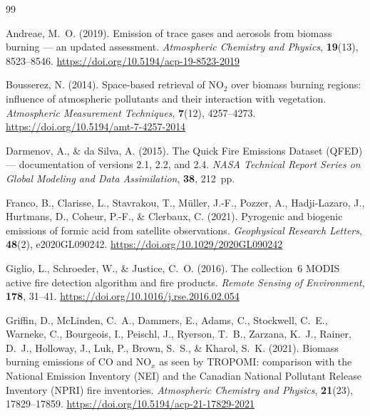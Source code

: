 \documentclass[draft]{agujournal2019}
\begin{document}

\begin{thebibliography}{99}

Andreae, M.~O. (2019).
Emission of trace gases and aerosols from biomass burning --- an updated
  assessment.
\textit{Atmospheric Chemistry and Physics}, \textbf{19}(13), 8523--8546.
\url{https://doi.org/10.5194/acp-19-8523-2019}

Bousserez, N. (2014).
Space-based retrieval of NO$_2$ over biomass burning regions: influence of
  atmospheric pollutants and their interaction with vegetation.
\textit{Atmospheric Measurement Techniques}, \textbf{7}(12), 4257--4273.
\url{https://doi.org/10.5194/amt-7-4257-2014}

Darmenov, A., \& da Silva, A. (2015).
The Quick Fire Emissions Dataset (QFED) --- documentation of versions 2.1,
  2.2, and 2.4.
\textit{NASA Technical Report Series on Global Modeling and Data
  Assimilation}, \textbf{38}, 212~pp.

Franco, B., Clarisse, L., Stavrakou, T., M{\"u}ller, J.-F., Pozzer, A.,
  Hadji-Lazaro, J., Hurtmans, D., Coheur, P.-F., \& Clerbaux, C. (2021).
Pyrogenic and biogenic emissions of formic acid from satellite observations.
\textit{Geophysical Research Letters}, \textbf{48}(2), e2020GL090242.
\url{https://doi.org/10.1029/2020GL090242}

Giglio, L., Schroeder, W., \& Justice, C.~O. (2016).
The collection~6 MODIS active fire detection algorithm and fire products.
\textit{Remote Sensing of Environment}, \textbf{178}, 31--41.
\url{https://doi.org/10.1016/j.rse.2016.02.054}

Griffin, D., McLinden, C.~A., Dammers, E., Adams, C., Stockwell, C.~E.,
  Warneke, C., Bourgeois, I., Peischl, J., Ryerson, T.~B., Zarzana, K.~J.,
  Rainer, D.~J., Holloway, J., Luk, P., Brown, S.~S., \& Kharol, S.~K.
  (2021).
Biomass burning emissions of CO and NO$_x$ as seen by TROPOMI: comparison
  with the National Emission Inventory (NEI) and the Canadian National
  Pollutant Release Inventory (NPRI) fire inventories.
\textit{Atmospheric Chemistry and Physics}, \textbf{21}(23), 17829--17859.
\url{https://doi.org/10.5194/acp-21-17829-2021}


\end{thebibliography}
\end{document}
